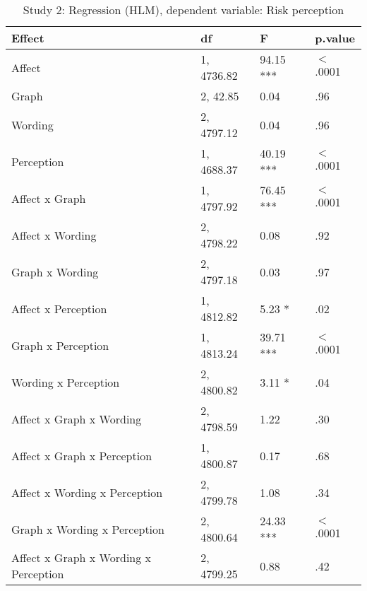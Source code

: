 \begin{table}[ht]
\centering
\caption{Study 2: Regression (HLM), dependent variable: Risk perception} 
\label{tab:study_2_affect_regression}
\begin{tabular}{llll}
  \hline
Effect & df & F & p.value \\ 
  \hline
Affect & 1, 4736.82 & 94.15 *** & $<$.0001 \\ 
  Graph & 2, 42.85 & 0.04 & .96 \\ 
  Wording & 2, 4797.12 & 0.04 & .96 \\ 
  Perception & 1, 4688.37 & 40.19 *** & $<$.0001 \\ 
  Affect x Graph & 1, 4797.92 & 76.45 *** & $<$.0001 \\ 
  Affect x Wording & 2, 4798.22 & 0.08 & .92 \\ 
  Graph x Wording & 2, 4797.18 & 0.03 & .97 \\ 
  Affect x Perception & 1, 4812.82 & 5.23 * & .02 \\ 
  Graph x Perception & 1, 4813.24 & 39.71 *** & $<$.0001 \\ 
  Wording x Perception & 2, 4800.82 & 3.11 * & .04 \\ 
  Affect x Graph x Wording & 2, 4798.59 & 1.22 & .30 \\ 
  Affect x Graph x Perception & 1, 4800.87 & 0.17 & .68 \\ 
  Affect x Wording x Perception & 2, 4799.78 & 1.08 & .34 \\ 
  Graph x Wording x Perception & 2, 4800.64 & 24.33 *** & $<$.0001 \\ 
  Affect x Graph x Wording x Perception & 2, 4799.25 & 0.88 & .42 \\ 
   \hline
\end{tabular}
\end{table}
